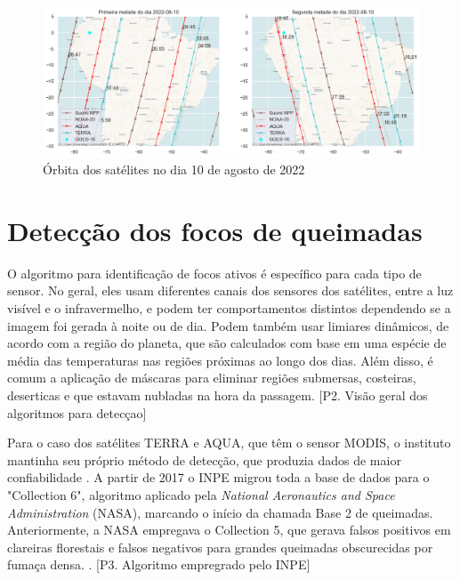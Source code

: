 \documentclass[cic,tc]{iiufrgs}
\begin{document}
\begin{figure}
    \caption{Órbita dos satélites no dia 10 de agosto de 2022}
    \begin{center}
        \includegraphics[width=35em]{orbita2022-08-10}
    \end{center}
    \label{fig:orbita2022-08-10}
\end{figure}

\section{Detecção dos focos de queimadas}

O algoritmo para identificação de focos ativos é específico para cada tipo 
de sensor. No geral, eles usam diferentes canais dos sensores dos 
satélites, entre a luz visível e o infravermelho, e podem ter comportamentos 
distintos dependendo se a imagem foi gerada à noite ou de dia. Podem também 
usar limiares dinâmicos, de acordo com a região do planeta, que são calculados com 
base em uma espécie de média das temperaturas nas regiões próximas ao longo dos 
dias. Além disso, é comum a aplicação de máscaras para eliminar regiões submersas, 
costeiras, deserticas e que estavam nubladas na hora da passagem. 
[P2. Visão geral dos algoritmos para detecçao] \par

Para o caso dos satélites TERRA e AQUA, que têm o sensor MODIS, o 
instituto mantinha seu próprio método de detecção, que produzia dados de 
maior confiabilidade \citep{PerguntasFrequentesINPE}. 
A partir de 2017 o INPE migrou toda a base de dados para o "Collection 6", 
algoritmo aplicado pela \textit{National Aeronautics and Space Administration} 
(NASA), marcando o início da chamada Base 2 de queimadas. Anteriormente, a NASA 
empregava o Collection 5, que gerava falsos positivos em clareiras florestais e 
falsos negativos para grandes queimadas obscurecidas por fumaça densa.
\citep{SCHROEDER2008}. [P3. Algoritmo empregrado pelo INPE] \par
\end{document}
